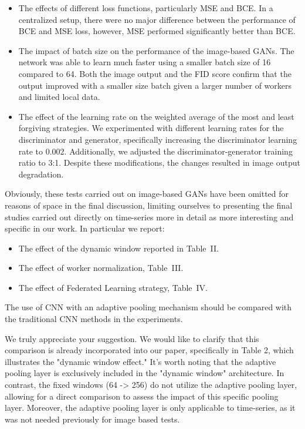 \documentclass{article}
\begin{document}
\begin{itemize}
	\item The effects of different loss functions, particularly MSE and BCE. In a centralized setup, there were no major difference between the performance of BCE and MSE loss, however, MSE performed significantly better than BCE. 
 
	\item The impact of batch size on the performance of the image-based GANs. The network was able to learn much faster using a smaller batch size of 16 compared to 64. Both the image output and the FID score confirm that the output improved with a smaller size batch given a larger number of workers and limited local data.
 
	\item The effect of the learning rate on the weighted average of the most and least forgiving strategies. We experimented with different learning rates for the discriminator and generator, specifically increasing the discriminator learning rate to 0.002. Additionally, we adjusted the discriminator-generator training ratio to 3:1. Despite these modifications, the changes resulted in image output degradation.
\end{itemize}
Obviously, these tests carried out on image-based GANs have been omitted for reasons of space in the final discussion, limiting ourselves to presenting the final studies carried out directly on time-series more in detail as more interesting and specific in our work.
In particular we report:
\begin{itemize}
	\item The effect of the dynamic window reported in Table~II.
	\item The effect of worker normalization, Table~III.
	\item The effect of Federated Learning strategy, Table~IV.
\end{itemize}


\RC The use of CNN with an adaptive pooling mechanism should be compared with the traditional CNN methods in the experiments.

\AR We truly appreciate your suggestion. We would like to clarify that this comparison is already incorporated into our paper, specifically in Table 2, which illustrates the "dynamic window effect." It's worth noting that the adaptive pooling layer is exclusively included in the "dynamic window" architecture. In contrast, the fixed windows (64 -> 256) do not utilize the adaptive pooling layer, allowing for a direct comparison to assess the impact of this specific pooling layer. Moreover,  the adaptive pooling layer is only applicable to time-series, as it was not needed previously for image based tests.
\end{document}
